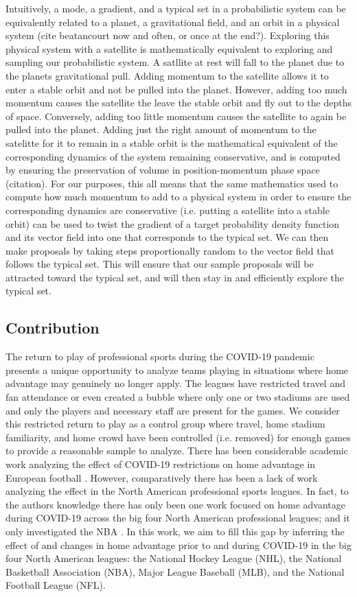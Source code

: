 Intuitively, a mode, a gradient, and a typical set in a probabilistic system can be equivalently related to a planet, a gravitational field, and an orbit in a physical system (cite beatancourt now and often, or once at the end?). Exploring this physical system with a satellite is mathematically equivalent to exploring and sampling our probabilistic system. A satllite at rest will fall to the planet due to the planets gravitational pull. Adding momentum to the satellite allows it to enter a stable orbit and not be pulled into the planet. However, adding too much momentum causes the satellite the leave the stable orbit and fly out to the depths of space. Conversely, adding too little momentum causes the satellite to again be pulled into the planet. Adding just the right amount of momentum to the satelitte for it to remain in a stable orbit is the mathematical equivalent of the corresponding dynamics of the system remaining conservative, and is computed by ensuring the preservation of volume in position-momentum phase space (citation). For our purposes, this all means that the same mathematics used to compute how much momentum to add to a physical system in order to ensure the corresponding dynamics are conservative (i.e. putting a satellite into a stable orbit) can be used to twist the gradient of a target probability density function and its vector field into one that corresponds to the typical set. We can then make proposals by taking steps proportionally random to the vector field that follows the typical set. This will ensure that our sample proposals will be attracted toward the typical set, and will then stay in and efficiently explore the typical set.


\subsection{Contribution}

The return to play of professional sports during the COVID-19 pandemic presents a unique opportunity to analyze teams playing in situations where home advantage may genuinely no longer apply. The leagues have restricted travel and fan attendance or even created a bubble where only one or two stadiums are used and only the players and necessary staff are present for the games. We consider this restricted return to play as a control group where travel, home stadium familiarity, and home crowd have been controlled (i.e. removed) for enough games to provide a reasonable sample to analyze. There has been considerable academic work analyzing the effect of COVID-19 restrictions on home advantage in European football \cite{Benz2020}. However, comparatively there has been a lack of work analyzing the effect in the North American professional sports leagues. In fact, to the authors knowledge there has only been one work focused on home advantage during COVID-19 across the big four North American professional leagues; and it only investigated the NBA \cite{McHill2020}. In this work, we aim to fill this gap by inferring the effect of and changes in home advantage prior to and during COVID-19 in the big four North American leagues: the National Hockey League (NHL), the National Basketball Association (NBA), Major League Baseball (MLB), and the National Football League (NFL).

